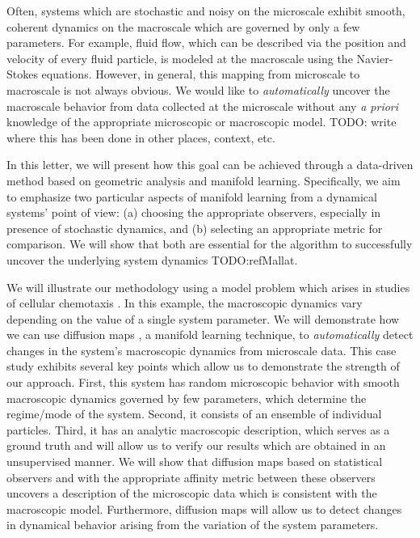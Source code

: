 \documentclass[prl, reprint, final, showkeys]{revtex4-1}
\begin{document}
Often, systems which are stochastic and noisy on the microscale exhibit smooth, coherent dynamics on the macroscale which are governed by only a few parameters.
%
For example, fluid flow, which can be described via the position and velocity of every fluid particle, is modeled at the macroscale using the Navier-Stokes equations.
%
However, in general, this mapping from microscale to macroscale is not always obvious.
%
We would like to {\em automatically} uncover the macroscale behavior from data collected at the microscale without any {\em a priori} knowledge of the appropriate microscopic or macroscopic model.
%
TODO: write where this has been done in other places, context, etc.

In this letter, we will present how this goal can be achieved through a data-driven method based on geometric analysis and manifold learning. Specifically, we aim to emphasize two particular aspects of manifold learning from a dynamical systems' point of view: (a) choosing the appropriate observers, especially in presence of stochastic dynamics, and (b) selecting an appropriate metric for comparison. 
%
We will show that both are essential for the algorithm to successfully uncover the underlying system dynamics TODO:refMallat. 

We will illustrate our methodology using a model problem which arises in studies of cellular chemotaxis \cite{othmer2000diffusion}.
%
In this example, the macroscopic dynamics vary depending on the value of a single system parameter.
%
We will demonstrate how we can use diffusion maps \cite{coifman2005geometric}, a manifold learning technique, to {\em automatically} detect changes in the system's macroscopic dynamics from microscale data.
%
This case study exhibits several key points which allow us to demonstrate the strength of our approach.
%
First, this system has random microscopic behavior with smooth macroscopic dynamics governed by few parameters, which determine the regime/mode of the system. 
%
Second, it consists of an ensemble of individual particles. 
%
Third, it has an analytic macroscopic description, which serves as a ground truth and will allow us to verify our results which are obtained in an unsupervised manner.
%
We will show that diffusion maps based on statistical observers and with the appropriate affinity metric between these observers uncovers a description of the microscopic data which is consistent with the macroscopic model.
%
Furthermore, diffusion maps will allow us to detect changes in dynamical behavior arising from the variation of the system parameters. 
\end{document}
